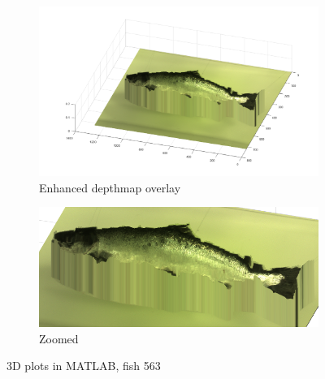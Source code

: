 \begin{figure}[H]
    \medskip
    \begin{subfigure}{0.41\textwidth}
        \includegraphics[width=\linewidth]{images/results/3D_plots/fixed_3D_fish_63}
        \caption{Enhanced depthmap overlay}
    \end{subfigure}\hspace*{\fill}
    \begin{subfigure}{0.57\textwidth}
        \includegraphics[width=\linewidth]{images/results/3D_plots/zoomed_fixed_3D_fish_63}
        \caption{Zoomed}
    \end{subfigure}
    
    \caption{3D plots in MATLAB, fish 563} 
    \label{fig:3D_plot_63}
\end{figure}


